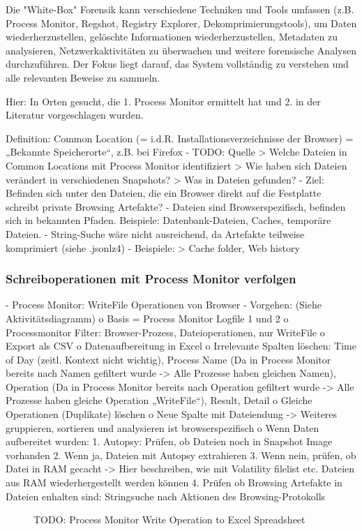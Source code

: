 	Die "White-Box" Forensik kann verschiedene Techniken und Tools umfassen (z.B. Process Monitor, Regshot, Registry Explorer, Dekomprimierungstools), um Daten wiederherzustellen, gelöschte Informationen wiederherzustellen, Metadaten zu analysieren, Netzwerkaktivitäten zu überwachen und weitere forensische Analysen durchzuführen. Der Fokus liegt darauf, das System vollständig zu verstehen und alle relevanten Beweise zu sammeln.
	
	Hier: In Orten gesucht, die 1. Process Monitor ermittelt hat und 2. in der Literatur vorgeschlagen wurden.

Definition: Common Location
	(= i.d.R. Installationsverzeichnisse der Browser) = „Bekannte Speicherorte“, z.B. bei Firefox   	
	- TODO: Quelle
		> Welche Dateien in Common Locations mit Process Monitor identifiziert
		> Wie haben sich Dateien verändert in verschiedenen Snapshots?
		> Was in Dateien gefunden?	
	-	Ziel: Befinden sich unter den Dateien, die ein Browser direkt auf die Festplatte schreibt private Browsing Artefakte?
	-	Dateien sind Browserspezifisch, befinden sich in bekannten Pfaden. Beispiele: Datenbank-Dateien, Caches, temporäre Dateien.
	-	String-Suche wäre nicht ausreichend, da Artefakte teilweise komprimiert (siehe .jsonlz4)	
	- Beispiele:
		> Cache folder, Web history \cite{Montasari.2015}

\subsubsection*{Schreiboperationen mit Process Monitor verfolgen}
- Process Monitor: WriteFile Operationen von Browser
- Vorgehen: (Siehe Aktivitätsdiagramm)
	o	Basis = Process Monitor Logfile 1 und 2
	o	Processmonitor Filter: Browser-Prozess, Dateioperationen, nur WriteFile
	o	Export als CSV
	o	Datenaufbereitung in Excel
	o	Irrelevante Spalten löschen: Time of Day (zeitl. Kontext nicht wichtig), Process Name (Da in Process Monitor bereits nach Namen gefiltert wurde -> Alle Prozesse haben gleichen Namen), Operation (Da in Process Monitor bereits nach Operation gefiltert wurde -> Alle Prozesse haben gleiche Operation „WriteFile“), Result, Detail
	o	Gleiche Operationen (Duplikate) löschen
	o	Neue Spalte mit Dateiendung
	-> Weiteres gruppieren, sortieren und analysieren ist browserspezifisch
	o	Wenn Daten aufbereitet wurden: 
	1.	Autopsy: Prüfen, ob Dateien noch in Snapshot Image vorhanden
	2.	Wenn ja, Dateien mit Autopsy extrahieren 
	3.	Wenn nein, prüfen, ob Datei in RAM gecacht
	-> Hier beschreiben, wie mit Volatility filelist etc. Dateien aus RAM wiederhergestellt werden können
	4.	Prüfen ob Browsing Artefakte in Dateien enhalten sind: Stringsuche nach Aktionen des Browsing-Protokolls
	\begin{figure}[h!]
		\centering
		\small
		\centerline{\resizebox{\linewidth}{!}{}}
		\caption{TODO: Process Monitor Write Operation to Excel Spreadsheet}
		\label{fig:jes}
	\end{figure}

